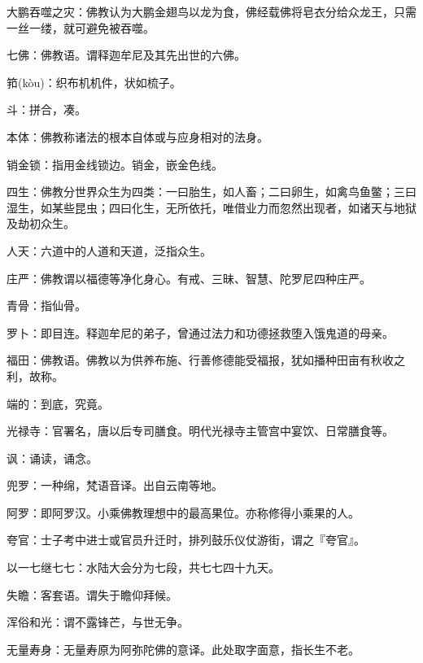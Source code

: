 \startbuffer[498]
大鹏吞噬之灾：佛教认为大鹏金翅鸟以龙为食，佛经载佛将皂衣分给众龙王，只需一丝一缕，就可避免被吞噬。
\stopbuffer


\startbuffer[499]
七佛：佛教语。谓释迦牟尼及其先出世的六佛。
\stopbuffer


\startbuffer[500]
筘(kòu)：织布机机件，状如梳子。
\stopbuffer


\startbuffer[501]
斗：拼合，凑。
\stopbuffer


\startbuffer[502]
本体：佛教称诸法的根本自体或与应身相对的法身。
\stopbuffer


\startbuffer[503]
销金锁：指用金线锁边。销金，嵌金色线。
\stopbuffer


\startbuffer[504]
四生：佛教分世界众生为四类：一曰胎生，如人畜；二曰卵生，如禽鸟鱼鳖；三曰湿生，如某些昆虫；四曰化生，无所依托，唯借业力而忽然出现者，如诸天与地狱及劫初众生。
\stopbuffer


\startbuffer[505]
人天：六道中的人道和天道，泛指众生。
\stopbuffer


\startbuffer[506]
庄严：佛教谓以福德等净化身心。有戒、三昧、智慧、陀罗尼四种庄严。
\stopbuffer


\startbuffer[507]
青骨：指仙骨。
\stopbuffer


\startbuffer[508]
罗卜：即目连。释迦牟尼的弟子，曾通过法力和功德拯救堕入饿鬼道的母亲。
\stopbuffer


\startbuffer[509]
福田：佛教语。佛教以为供养布施、行善修德能受福报，犹如播种田亩有秋收之利，故称。
\stopbuffer


\startbuffer[510]
端的：到底，究竟。
\stopbuffer


\startbuffer[511]
光禄寺：官署名，唐以后专司膳食。明代光禄寺主管宫中宴饮、日常膳食等。
\stopbuffer


\startbuffer[512]
讽：诵读，诵念。
\stopbuffer


\startbuffer[513]
兜罗：一种绵，梵语音译。出自云南等地。
\stopbuffer


\startbuffer[514]
阿罗：即阿罗汉。小乘佛教理想中的最高果位。亦称修得小乘果的人。
\stopbuffer


\startbuffer[515]
夸官：士子考中进士或官员升迁时，排列鼓乐仪仗游街，谓之『夸官』。
\stopbuffer


\startbuffer[516]
以一七继七七：水陆大会分为七段，共七七四十九天。
\stopbuffer


\startbuffer[517]
失瞻：客套语。谓失于瞻仰拜候。
\stopbuffer


\startbuffer[518]
浑俗和光：谓不露锋芒，与世无争。
\stopbuffer


\startbuffer[519]
无量寿身：无量寿原为阿弥陀佛的意译。此处取字面意，指长生不老。
\stopbuffer


